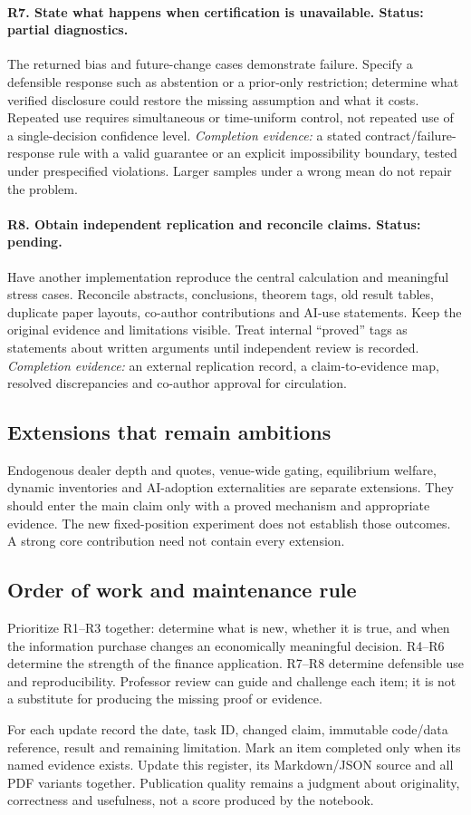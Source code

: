 \paragraph{R7. State what happens when certification is unavailable. Status: partial diagnostics.}
The returned bias and future-change cases demonstrate failure. Specify a
defensible response such as abstention or a prior-only restriction; determine
what verified disclosure could restore the missing assumption and what it costs.
Repeated use requires simultaneous or time-uniform control, not repeated use of
a single-decision confidence level.
\emph{Completion evidence:} a stated contract/failure-response rule with a valid
guarantee or an explicit impossibility boundary, tested under prespecified
violations. Larger samples under a wrong mean do not repair the problem.

\paragraph{R8. Obtain independent replication and reconcile claims. Status: pending.}
Have another implementation reproduce the central calculation and meaningful
stress cases. Reconcile abstracts, conclusions, theorem tags, old result tables,
duplicate paper layouts, co-author contributions and AI-use statements. Keep
the original evidence and limitations visible. Treat internal ``proved'' tags
as statements about written arguments until independent review is recorded.
\emph{Completion evidence:} an external replication record, a claim-to-evidence
map, resolved discrepancies and co-author approval for circulation.

\subsection*{Extensions that remain ambitions}
Endogenous dealer depth and quotes, venue-wide gating, equilibrium welfare,
dynamic inventories and AI-adoption externalities are separate extensions.
They should enter the main claim only with a proved mechanism and appropriate
evidence. The new fixed-position experiment does not establish those outcomes.
A strong core contribution need not contain every extension.

\subsection*{Order of work and maintenance rule}
Prioritize R1--R3 together: determine what is new, whether it is true, and when
the information purchase changes an economically meaningful decision. R4--R6
determine the strength of the finance application. R7--R8 determine defensible
use and reproducibility. Professor review can guide and challenge each item;
it is not a substitute for producing the missing proof or evidence.

For each update record the date, task ID, changed claim, immutable code/data
reference, result and remaining limitation. Mark an item completed only when
its named evidence exists. Update this register, its Markdown/JSON source and
all PDF variants together. Publication quality remains a judgment about
originality, correctness and usefulness, not a score produced by the notebook.
\endgroup

